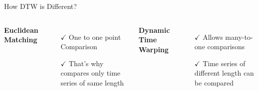 \documentclass[hyperref={pdfpagelabels=false}]{beamer}
\begin{document}
\begin{frame}{How DTW is Different?}
\begin{columns}
\large{\textbf{Euclidean Matching}}
\begin{itemize}
    \item[$\checkmark$] One to one point Comparison 
    \item[$\checkmark$] That's why compares only time series of same length 
\end{itemize}

\large{\textbf{Dynamic Time Warping}}
\begin{itemize}
    \item[$\checkmark$] Allows many-to-one comparisons 
    \item[$\checkmark$] Time series of different length can be compared
\end{itemize}
    
\end{columns} 
\end{frame}
\end{document}
